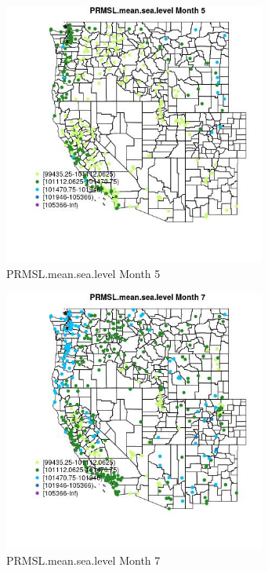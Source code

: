 \begin{figure} 
\centering  
\includegraphics[width=0.77\textwidth]{Code_Outputs/Report_ML_input_PM25_Step4_part_e_de_duplicated_aves_compiled_2019-05-18wNAs_MapObsMo5PRMSLmeansealevel.jpg} 
\caption{\label{fig:Report_ML_input_PM25_Step4_part_e_de_duplicated_aves_compiled_2019-05-18wNAsMapObsMo5PRMSLmeansealevel}PRMSL.mean.sea.level Month 5} 
\end{figure} 
 

\clearpage 

\begin{figure} 
\centering  
\includegraphics[width=0.77\textwidth]{Code_Outputs/Report_ML_input_PM25_Step4_part_e_de_duplicated_aves_compiled_2019-05-18wNAs_MapObsMo7PRMSLmeansealevel.jpg} 
\caption{\label{fig:Report_ML_input_PM25_Step4_part_e_de_duplicated_aves_compiled_2019-05-18wNAsMapObsMo7PRMSLmeansealevel}PRMSL.mean.sea.level Month 7} 
\end{figure} 
 

